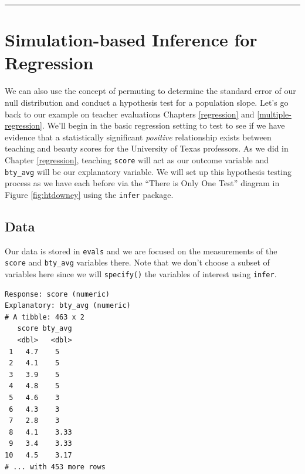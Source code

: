 \documentclass[12pt, krantz2,]{krantz}
\makeatletter
\newenvironment{Shaded}{\begin{snugshade}}{\end{snugshade}}
\newcommand{\KeywordTok}[1]{\textcolor[rgb]{0.27,0.27,0.27}{\textbf{#1}}}
\newcommand{\NormalTok}[1]{#1}
\newcommand{\OperatorTok}[1]{\textcolor[rgb]{0.43,0.43,0.43}{\textbf{#1}}}
\newcommand{\StringTok}[1]{\textcolor[rgb]{0.5,0.5,0.5}{#1}}
\newenvironment{kframe}{%
\medskip{}
\setlength{\fboxsep}{.8em}
 \def\at@end@of@kframe{}%
 \ifinner\ifhmode%
  \def\at@end@of@kframe{\end{minipage}}%
  \begin{minipage}{\columnwidth}%
 \fi\fi%
 \def\FrameCommand##1{\hskip\@totalleftmargin \hskip-\fboxsep
 \colorbox{shadecolor}{##1}\hskip-\fboxsep
     \hskip-\linewidth \hskip-\@totalleftmargin \hskip\columnwidth}%
 \MakeFramed {\advance\hsize-\width
   \@totalleftmargin\z@ \linewidth\hsize
   \@setminipage}}%
 {\par\unskip\endMakeFramed%
 \at@end@of@kframe}
\renewenvironment{Shaded}{\begin{kframe}}{\end{kframe}}
\makeatother
\begin{document}
\begin{center}\rule{0.5\linewidth}{\linethickness}\end{center}

\hypertarget{simulation-based-inference-for-regression}{%
\section{Simulation-based Inference for Regression}\label{simulation-based-inference-for-regression}}

We can also use the concept of permuting to determine the standard error of our null distribution and conduct a hypothesis test for a population slope. Let's go back to our example on teacher evaluations Chapters \ref{regression} and \ref{multiple-regression}. We'll begin in the basic regression setting to test to see if we have evidence that a statistically significant \emph{positive} relationship exists between teaching and beauty scores for the University of Texas professors. As we did in Chapter \ref{regression}, teaching \texttt{score} will act as our outcome variable and \texttt{bty\_avg} will be our explanatory variable. We will set up this hypothesis testing process as we have each before via the ``There is Only One Test'' diagram in Figure \ref{fig:htdowney} using the \texttt{infer} package.

\hypertarget{data-1}{%
\subsection{Data}\label{data-1}}

Our data is stored in \texttt{evals} and we are focused on the measurements of the \texttt{score} and \texttt{bty\_avg} variables there. Note that we don't choose a subset of variables here since we will \texttt{specify()} the variables of interest using \texttt{infer}.

\begin{Shaded}
\end{Shaded}

\begin{verbatim}
Response: score (numeric)
Explanatory: bty_avg (numeric)
# A tibble: 463 x 2
   score bty_avg
   <dbl>   <dbl>
 1   4.7    5   
 2   4.1    5   
 3   3.9    5   
 4   4.8    5   
 5   4.6    3   
 6   4.3    3   
 7   2.8    3   
 8   4.1    3.33
 9   3.4    3.33
10   4.5    3.17
# ... with 453 more rows
\end{verbatim}
\end{document}
